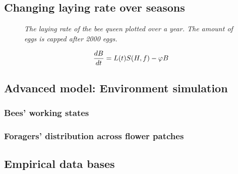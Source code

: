 	\subsection{Changing laying rate over seasons}
		\begin{figure}\label{fig:dynLayingRate}
			\centering
			\caption{\textit{The laying rate of the bee queen plotted over a year. The amount of eggs is capped after 2000 eggs.}}
		\end{figure}
		
		
		\begin{equation}\label{eq:changeBroodNumbersTime}
			{dB \over dt} = L(t)S(H,f)-\phi B
		\end{equation}
	
	\subsection{Advanced model: Environment simulation}
		\subsubsection{Bees' working states}
		\subsubsection{Foragers' distribution across flower patches}
	\subsection{Empirical data bases}


